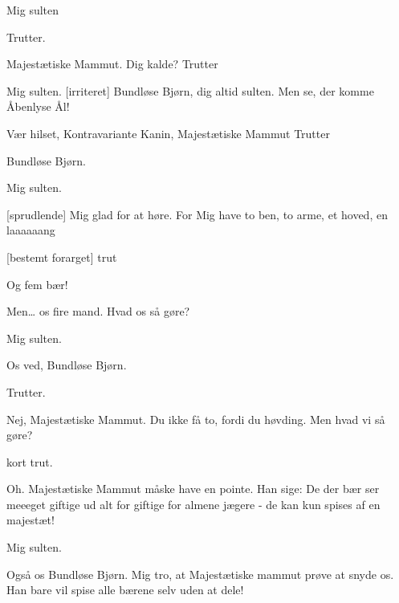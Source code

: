 \documentclass[a4paper,11pt]{article}
\begin{document}
\begin{sketch}


 Mig sulten

 Trutter.


 Majestætiske Mammut. Dig kalde?
 Trutter

 Mig sulten.
 [irriteret] Bundløse Bjørn, dig altid sulten. Men se, der komme Åbenlyse Ål!


 Vær hilset, Kontravariante Kanin, Majestætiske Mammut
 Trutter

 Bundløse Bjørn.

 Mig sulten.

 [sprudlende] Mig glad for at høre. For Mig have to ben, to arme, et hoved, en laaaaaang

 [bestemt forarget] trut


 Og fem bær! 

 Men… os fire mand. Hvad os så gøre?


 Mig sulten.

 Os ved, Bundløse Bjørn.


 Trutter.

 Nej, Majestætiske Mammut. Du ikke få to, fordi du høvding. Men hvad vi så gøre?


 kort trut.

 Oh. Majestætiske Mammut måske have en pointe. Han sige: De der bær ser meeeget giftige ud alt for giftige for almene jægere - de kan kun spises af en majestæt!  

 Mig sulten.

 Også os Bundløse Bjørn.  Mig tro, at Majestætiske mammut prøve at snyde os. Han bare vil spise alle bærene selv uden at dele!  


\end{sketch}
\end{document}
